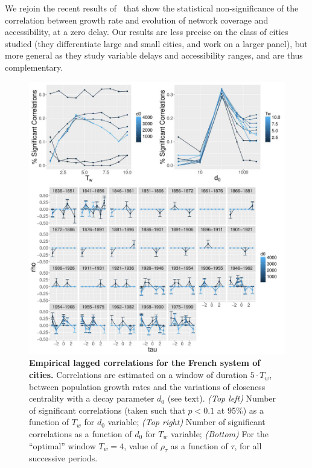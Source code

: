 We rejoin the recent results of~\cite{mimeur:hal-01616746} that show the statistical non-significance of the correlation between growth rate and evolution of network coverage and accessibility, at a zero delay. Our results are less precise on the class of cities studied (they differentiate large and small cities, and work on a larger panel), but more general as they study variable delays and accessibility ranges, and are thus complementary.


\begin{figure}
	\includegraphics[width=\linewidth]{figures/6-2-3-fig-macrocoevol-empirical.jpg}
	\caption[Empirical lagged correlations for the French system of cities]{\textbf{Empirical lagged correlations for the French system of cities.} Correlations are estimated on a window of duration $5\cdot T_w$, between population growth rates and the variations of closeness centrality with a decay parameter $d_0$ (see text). \textit{(Top left)} Number of significant correlations (taken such that $p<0.1$ at 95\%) as a function of $T_w$ for $d_0$ variable; \textit{(Top right)} Number of significant correlations as a function of $d_0$ for $T_w$ variable; \textit{(Bottom)} For the ``optimal'' window $T_w = 4$, value of $\rho_{\tau}$ as a function of $\tau$, for all successive periods.\label{fig:macrocoevol:empirical}}
\end{figure}


